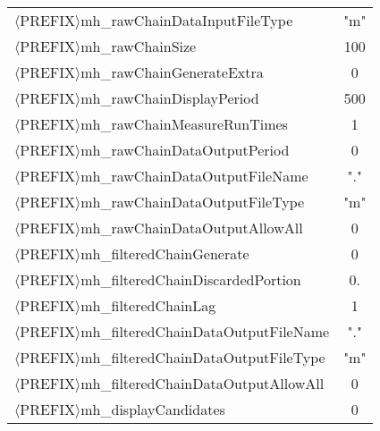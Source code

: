 \begin{table}[htpb]
\begin{center}
\begin{tabular}{l c}
 $\langle$PREFIX$\rangle$mh\_rawChainDataInputFileType                & "m"   \\ %
 $\langle$PREFIX$\rangle$mh\_rawChainSize                             & 100   \\ %
 $\langle$PREFIX$\rangle$mh\_rawChainGenerateExtra                    &  0    \\ %
 $\langle$PREFIX$\rangle$mh\_rawChainDisplayPeriod                    & 500   \\ %
 $\langle$PREFIX$\rangle$mh\_rawChainMeasureRunTimes                  &  1    \\ %
 $\langle$PREFIX$\rangle$mh\_rawChainDataOutputPeriod                 &  0    \\ %
 $\langle$PREFIX$\rangle$mh\_rawChainDataOutputFileName               & "."   \\ %
 $\langle$PREFIX$\rangle$mh\_rawChainDataOutputFileType               & "m"   \\ %
 $\langle$PREFIX$\rangle$mh\_rawChainDataOutputAllowAll               &  0    \\ %
 $\langle$PREFIX$\rangle$mh\_filteredChainGenerate                    &  0    \\ %
 $\langle$PREFIX$\rangle$mh\_filteredChainDiscardedPortion            &  0.   \\ %
 $\langle$PREFIX$\rangle$mh\_filteredChainLag                         &  1    \\ %
 $\langle$PREFIX$\rangle$mh\_filteredChainDataOutputFileName          & "."   \\ %
 $\langle$PREFIX$\rangle$mh\_filteredChainDataOutputFileType          & "m"   \\ %
 $\langle$PREFIX$\rangle$mh\_filteredChainDataOutputAllowAll          &  0   \\ %
 $\langle$PREFIX$\rangle$mh\_displayCandidates                        &  0    \\ %

\end{tabular}
\end{center}
\end{table}
